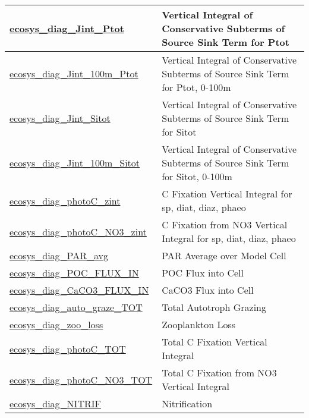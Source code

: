 {\begin{center}
\begin{longtable}{| p{2.0in} | p{4.0in} |}
    \hline
    \hyperref[subsec:var_sec_forcing_ecosys_diag_Jint_Ptot]{ecosys\_diag\_Jint\_Ptot} & Vertical Integral of Conservative Subterms of Source Sink Term for Ptot \\
    \hline
    \hyperref[subsec:var_sec_forcing_ecosys_diag_Jint_100m_Ptot]{ecosys\_diag\_Jint\_100m\_Ptot} & Vertical Integral of Conservative Subterms of Source Sink Term for Ptot, 0-100m \\
    \hline
    \hyperref[subsec:var_sec_forcing_ecosys_diag_Jint_Sitot]{ecosys\_diag\_Jint\_Sitot} & Vertical Integral of Conservative Subterms of Source Sink Term for Sitot \\
    \hline
    \hyperref[subsec:var_sec_forcing_ecosys_diag_Jint_100m_Sitot]{ecosys\_diag\_Jint\_100m\_Sitot} & Vertical Integral of Conservative Subterms of Source Sink Term for Sitot, 0-100m \\
    \hline
    \hyperref[subsec:var_sec_forcing_ecosys_diag_photoC_zint]{ecosys\_diag\_photoC\_zint} & C Fixation Vertical Integral for sp, diat, diaz, phaeo \\
    \hline
    \hyperref[subsec:var_sec_forcing_ecosys_diag_photoC_NO3_zint]{ecosys\_diag\_photoC\_NO3\_zint} & C Fixation from NO3 Vertical Integral for sp, diat, diaz, phaeo \\
    \hline
    \hyperref[subsec:var_sec_forcing_ecosys_diag_PAR_avg]{ecosys\_diag\_PAR\_avg} & PAR Average over Model Cell \\
    \hline
    \hyperref[subsec:var_sec_forcing_ecosys_diag_POC_FLUX_IN]{ecosys\_diag\_POC\_FLUX\_IN} & POC Flux into Cell \\
    \hline
    \hyperref[subsec:var_sec_forcing_ecosys_diag_CaCO3_FLUX_IN]{ecosys\_diag\_CaCO3\_FLUX\_IN} & CaCO3 Flux into Cell \\
    \hline
    \hyperref[subsec:var_sec_forcing_ecosys_diag_auto_graze_TOT]{ecosys\_diag\_auto\_graze\_TOT} & Total Autotroph Grazing \\
    \hline
    \hyperref[subsec:var_sec_forcing_ecosys_diag_zoo_loss]{ecosys\_diag\_zoo\_loss} & Zooplankton Loss \\
    \hline
    \hyperref[subsec:var_sec_forcing_ecosys_diag_photoC_TOT]{ecosys\_diag\_photoC\_TOT} & Total C Fixation Vertical Integral \\
    \hline
    \hyperref[subsec:var_sec_forcing_ecosys_diag_photoC_NO3_TOT]{ecosys\_diag\_photoC\_NO3\_\-TOT} & Total C Fixation from NO3 Vertical Integral \\
    \hline
    \hyperref[subsec:var_sec_forcing_ecosys_diag_NITRIF]{ecosys\_diag\_NITRIF} & Nitrification \\

\end{longtable}
\end{center}}
